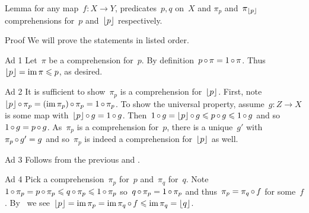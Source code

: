 \documentclass[b]{subfiles}
\begin{document}
\begin{parsec}
\begin{point}{Lemma}
\noindent for any map~$f\colon X \to Y$,
    predicates~$p,q$ on~$X$ and
$\pi_p$ and~$\pi_{\left\lfloor p\right\rfloor}$
    comprehensions for~$p$ and~$\left\lfloor p\right\rfloor$ respectively.
\begin{point}{Proof}%
We will prove the statements in listed order.
\begin{point}{Ad 1}%
    Let~$\pi$ be a comprehension for~$p$.
    By definition~$p \mathop{\circ} \pi = 1 \mathop{\circ} \pi$.
    Thus~$\left\lfloor p\right\rfloor = \operatorname{im} \pi \leqslant p$, as desired.
\end{point}
\begin{point}{Ad 2}%
It is sufficient to show~$\pi_p$ is a comprehension for~$\left\lfloor p\right\rfloor$.
First, note~$\left\lfloor p\right\rfloor\mathop{\circ} \pi_p = (\operatorname{im} \pi_p) \mathop{\circ} \pi_p = 1 \mathop{\circ} \pi_p$.
To show the universal property,
    assume~$g\colon Z \to X$
    is some map with~$\left\lfloor p\right\rfloor \mathop{\circ} g = 1 \mathop{\circ} g$.
Then~$1 \mathop{\circ} g = \left\lfloor p\right\rfloor \mathop{\circ} g \leqslant p \mathop{\circ} g \leqslant 1 \mathop{\circ} g$
    and so~$1 \mathop{\circ} g = p \mathop{\circ} g$.
As~$\pi_p$ is a comprehension for~$p$,
    there is a unique~$g'$ with~$\pi_p \mathop{\circ}  g' = g$
    and so~$\pi_p$ is indeed a comprehension for~$\left\lfloor p\right\rfloor$ as well.
\end{point}
\begin{point}{Ad 3}%
Follows from the previous and .
\end{point}
\begin{point}{Ad 4}%
Pick a comprehension~$\pi_p$ for~$p$ and~$\pi_q$ for~$q$.
Note~$1 \mathop{\circ} \pi_p = p \mathop{\circ} \pi_p
                \leqslant q \mathop{\circ} \pi_p \leqslant 1 \mathop{\circ} \pi_p $
so~$q \mathop{\circ} \pi_p = 1 \mathop{\circ} \pi_p$
and thus~$\pi_p = \pi_q \mathop{\circ} f$ for some~$f$.
By~
    we see~$\left\lfloor p\right\rfloor = \operatorname{im} \pi_p = \operatorname{im} \pi_q \mathop{\circ} f \leqslant \operatorname{im} \pi_q = \left\lfloor q\right\rfloor$.
\end{point}
\end{point}
\end{point}
\end{parsec}
\end{document}
